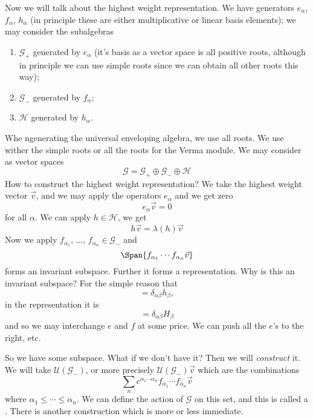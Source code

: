 Now we will talk about the highest weight representation. We have
generators $e_{\alpha}$, $f_{\alpha}$, $h_{\alpha}$ (in principle
these are either multiplicative or linear basis elements); we may
consider the subalgebras
\begin{enumerate}
\item $\mathscr{G}_{+}$ generated by $e_{\alpha}$ (it's basis as
  a vector space is all positive roots, although in principle we
  can use simple roots since we can obtain all other roots this way);
\item $\mathscr{G}_{-}$ generated by $f_{\alpha}$;
\item $\mathscr{H}$ generated by $h_{\alpha}$.
\end{enumerate}
Whe ngenerating the universal enveloping algebra, we use all
roots. We use wither the simple roots or all the roots for the
Verma module. We may consider as vector spaces
\begin{equation}
\mathscr{G}=\mathscr{G}_{+}\oplus\mathscr{G}_{-}\oplus\mathscr{H}
\end{equation}
How to construct the highest weight representation? We take the
highest weight vector $\vec{v}$, and we may apply the operators
$e_{\alpha}$ and we get zero
\begin{equation}
e_{\alpha}\vec{v}=0
\end{equation}
for all $\alpha$. We can apply $h\in\mathscr{H}$, we get
\begin{equation}
h\vec{v}=\lambda(h)\vec{v}
\end{equation}
Now we apply $f_{\alpha_{1}}$, $\dots$,
$f_{\alpha_{n}}\in\mathscr{G}_{-}$ and
\begin{equation}
\Span\{f_{\alpha_{1}}\cdots f_{\alpha_{n}}\vec{v}\}
\end{equation}
forms an invariant subspace. Further it forms a
representation. Why is this an invariant subspace? For the simple
reason that
\begin{equation}
[e_{\alpha},f_{\beta}]=\delta_{\alpha\beta}h_{\beta},
\end{equation}
in the representation it is
\begin{equation}
[E_{\alpha},F_{\beta}]=\delta_{\alpha\beta}H_{\beta}
\end{equation}
and so we may interchange $e$ and $f$ at some price. We can push
all the $e$'s to the right, etc.

So we have some subspace. What if we don't have it? Then we will
\emph{construct} it. We will take $\mathcal{U}(\mathscr{G}_{-})$,
or more precisely $\mathcal{U}(\mathscr{G}_{-})\vec{v}$
 which are the combinations
\begin{equation}
\sum_{n}c^{\alpha_{1}\cdots\alpha_{n}}f_{\alpha_{1}}\cdots f_{\alpha_{n}}\vec{v}
\end{equation}
where $\alpha_{1}\leq\cdots\leq\alpha_{n}$. We can define the
action of $\mathscr{G}$ on this set, and this is called a
. There is another construction which is
more or less immediate.

